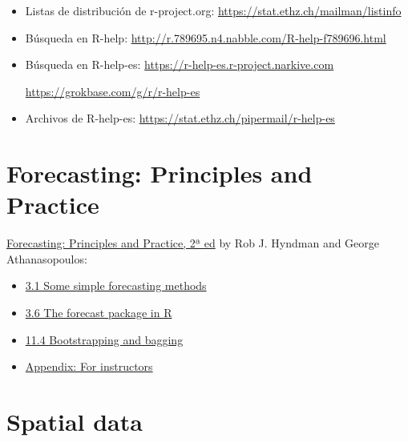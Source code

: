 \documentclass[]{book}
\theoremstyle{definition}
\theoremstyle{definition}
\theoremstyle{definition}
\theoremstyle{remark}
\begin{document}
\begin{itemize}
  \begin{itemize}
  \item
    Listas de distribución de r-project.org:
    \url{https://stat.ethz.ch/mailman/listinfo}
  \item
    Búsqueda en R-help:
    \url{http://r.789695.n4.nabble.com/R-help-f789696.html}
  \item
    Búsqueda en R-help-es: \url{https://r-help-es.r-project.narkive.com}

    \url{https://grokbase.com/g/r/r-help-es}
  \item
    Archivos de R-help-es:
    \url{https://stat.ethz.ch/pipermail/r-help-es}
  \end{itemize}
\end{itemize}

\section{Forecasting: Principles and Practice}\label{forecast-links}

\href{https://otexts.com/fpp2}{Forecasting: Principles and Practice, 2ª
ed} by Rob J. Hyndman and George Athanasopoulos:

\begin{itemize}
\item
  \href{https://otexts.com/fpp2/simple-methods.html}{3.1 Some simple
  forecasting methods}
\item
  \href{https://otexts.com/fpp2/the-forecast-package-in-r.html}{3.6 The
  forecast package in R}
\item
  \href{https://otexts.com/fpp2/bootstrap.html}{11.4 Bootstrapping and
  bagging}
\item
  \href{https://otexts.com/fpp2/appendix-for-instructors.html}{Appendix:
  For instructors}
\end{itemize}

\section{Spatial data}\label{spatial-links}
\end{document}
